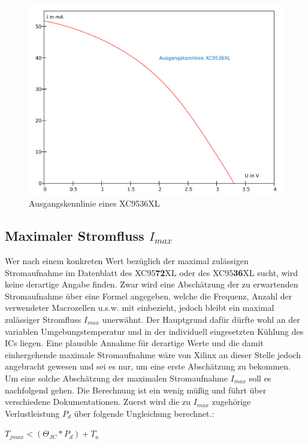 \documentclass{article}
\begin{document}
\newpage

\begin{figure}[!h]
	\centering
	\includegraphics[width=1\linewidth]{Figures/XC9536_output_characteristics}
	\caption{Ausgangskennlinie eines XC9536XL}
	\label{fig:out_characteristics}
\end{figure}

\subsection{Maximaler Stromfluss $I_{max}$}
\label{sec:max_I}
Wer nach einem konkreten Wert bezüglich der maximal zulässigen Stromaufnahme im Datenblatt \autocite{XC95_Spec} des XC95\textbf{72}XL oder des XC95\textbf{36}XL sucht, wird keine derartige Angabe finden.
Zwar wird eine Abschätzung der zu erwartenden Stromaufnahme über eine Formel angegeben, welche die Frequenz, Anzahl der verwendeter Macrozellen u.s.w. mit einbezieht, jedoch bleibt ein maximal zulässiger Stromfluss $I_{max}$ unerwähnt. Der Hauptgrund dafür dürfte wohl an der variablen Umgebungstemperatur und in der individuell eingesetzten Kühlung des ICs liegen. Eine plausible Annahme für derartige Werte und die damit einhergehende maximale Stromaufnahme wäre von Xilinx an dieser Stelle jedoch angebracht gewesen und sei es nur, um eine erste Abschätzung zu bekommen.\\

Um eine solche Abschätzung der maximalen Stromaufnahme $I_{max}$ soll es nachfolgend gehen. Die Berechnung ist ein wenig müßig und führt über verschiedene Dokumentationen.
Zuerst wird die zu $I_{max}$ zugehörige Verlustleistung $P_d$ über folgende Ungleichung berechnet.\autocite[16]{XC95_maxI}: 
\begin{center}
	$T_{jmax} < (\Theta_{JC}*P_d)+T_a$
\end{center}
\end{document}
